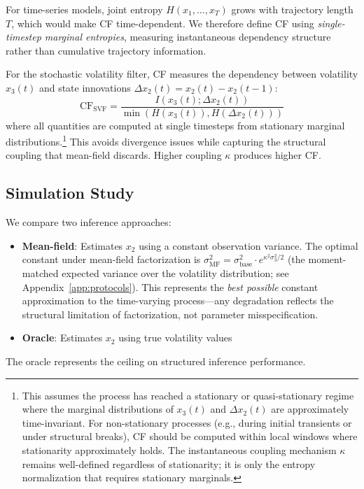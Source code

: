 \documentclass[10pt]{article} %
\theoremstyle{plain}
\theoremstyle{definition}
\newcommand{\CF}{\mathrm{CF}}
\newcommand{\MI}{I}
\newcommand{\Ent}{H}
\begin{document}
For time-series models, joint entropy $\Ent(x_1, \ldots, x_T)$ grows with trajectory length $T$, which would make CF time-dependent. We therefore define CF using \emph{single-timestep marginal entropies}, measuring instantaneous dependency structure rather than cumulative trajectory information.

For the stochastic volatility filter, CF measures the dependency between volatility $x_3(t)$ and state innovations $\Delta x_2(t) = x_2(t) - x_2(t-1)$:
\begin{equation}
\CF_{\text{SVF}} = \frac{\MI(x_3(t); \Delta x_2(t))}{\min(\Ent(x_3(t)), \Ent(\Delta x_2(t)))}
\end{equation}
where all quantities are computed at single timesteps from stationary marginal distributions.\footnote{This assumes the process has reached a stationary or quasi-stationary regime where the marginal distributions of $x_3(t)$ and $\Delta x_2(t)$ are approximately time-invariant. For non-stationary processes (e.g., during initial transients or under structural breaks), CF should be computed within local windows where stationarity approximately holds. The instantaneous coupling mechanism $\kappa$ remains well-defined regardless of stationarity; it is only the entropy normalization that requires stationary marginals.} This avoids divergence issues while capturing the structural coupling that mean-field discards. Higher coupling $\kappa$ produces higher CF.

\subsection{Simulation Study}

We compare two inference approaches:
\begin{itemize}
    \item \textbf{Mean-field}: Estimates $x_2$ using a constant observation variance. The optimal constant under mean-field factorization is $\sigma^2_{\text{MF}} = \sigma^2_{\text{base}} \cdot e^{\kappa^2 \sigma_3^2 / 2}$ (the moment-matched expected variance over the volatility distribution; see Appendix~\ref{app:protocols}). This represents the \emph{best possible} constant approximation to the time-varying process---any degradation reflects the structural limitation of factorization, not parameter misspecification.
    \item \textbf{Oracle}: Estimates $x_2$ using true volatility values
\end{itemize}

The oracle represents the ceiling on structured inference performance.
\end{document}
